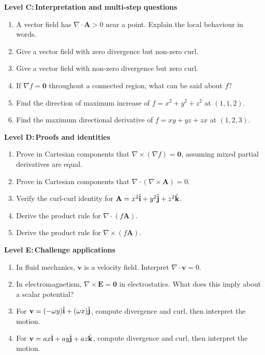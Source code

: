 \documentclass{otscience}
\begin{document}
\begin{practicebox}
    \textbf{Level C:\,Interpretation and multi-step questions}
    \begin{enumerate}
        \item A vector field has \(\nabla\cdot\mathbf{A}>0\) near a point. Explain the local behaviour in words.
        \item Give a vector field with zero divergence but non-zero curl.
        \item Give a vector field with non-zero divergence but zero curl.
        \item If \(\nabla f=\mathbf{0}\) throughout a connected region, what can be said about \(f\)?
        \item Find the direction of maximum increase of \(f=x^2+y^2+z^2\) at \((1,1,2)\).
        \item Find the maximum directional derivative of \(f=xy+yz+zx\) at \((1,2,3)\).
    \end{enumerate}

    \textbf{Level D:\,Proofs and identities}
    \begin{enumerate}
        \item Prove in Cartesian components that \(\nabla\times(\nabla f)=\mathbf{0}\), assuming mixed partial derivatives are equal.
        \item Prove in Cartesian components that \(\nabla\cdot(\nabla\times\mathbf{A})=0\).
        \item Verify the curl-curl identity for \(\mathbf{A}=x^2\hat{\mathbf{i}}+y^2\hat{\mathbf{j}}+z^2\hat{\mathbf{k}}\).
        \item Derive the product rule for \(\nabla\cdot(f\mathbf{A})\).
        \item Derive the product rule for \(\nabla\times(f\mathbf{A})\).
    \end{enumerate}

    \textbf{Level E:\,Challenge applications}
    \begin{enumerate}
        \item In fluid mechanics, \(\mathbf{v}\) is a velocity field. Interpret \(\nabla\cdot\mathbf{v}=0\).
        \item In electromagnetism, \(\nabla\times\mathbf{E}=\mathbf{0}\) in electrostatics. What does this imply about a scalar potential?
        \item For \(\mathbf{v}=(-\omega y)\hat{\mathbf{i}}+(\omega x)\hat{\mathbf{j}}\), compute divergence and curl, then interpret the motion.
        \item For \(\mathbf{v}=a x\hat{\mathbf{i}}+a y\hat{\mathbf{j}}+a z\hat{\mathbf{k}}\), compute divergence and curl, then interpret the motion.
    \end{enumerate}
\end{practicebox}

\ifdefined\OTCOMBINED%
\else
\end{document}
